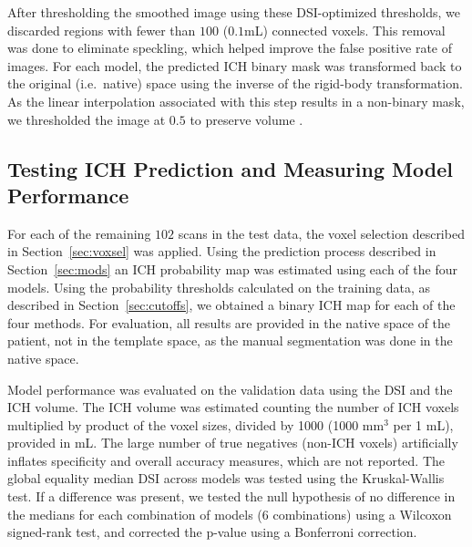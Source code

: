 \documentclass{elsarticle_nonatbib}\usepackage[]{graphicx}\usepackage[]{color}
\begin{document}
After thresholding the smoothed image using these DSI-optimized thresholds, we discarded regions with fewer than $100$ ($0.1$mL) connected voxels.  This removal was done to eliminate speckling, which helped improve the false positive rate of images.  For each model, the predicted ICH binary mask was transformed back to the original (i.e.~native) space using the inverse of the rigid-body transformation.  As the linear interpolation associated with this step results in a non-binary mask, we thresholded the image at $0.5$ to preserve volume \cite{flirt_reg}.



\subsection{Testing ICH Prediction and Measuring Model Performance}



For each of the remaining $102$ scans in the test data, the voxel selection described in Section~\ref{sec:voxsel} was applied. Using the prediction process described in Section~\ref{sec:mods} an ICH probability map was estimated using each of the four models.  Using the probability thresholds calculated on the training data, as described in Section~\ref{sec:cutoffs}, we obtained a binary ICH map for each of the four methods. For evaluation, all results are provided in
the native space of the patient, not in the template space, as the manual segmentation was done in the native space.

Model performance was evaluated on the validation data using the DSI and the ICH volume.  The ICH volume was estimated counting the number of ICH voxels multiplied by product of the voxel sizes, divided by 1000 (1000 mm$^3$ per 1 mL), provided in mL.  The large number of true negatives (non-ICH voxels) artificially inflates specificity and overall accuracy measures, which are not reported.  The global equality median DSI across models was tested using the Kruskal-Wallis test.  If a difference was present, we tested the null hypothesis of no difference in the medians for each combination of models ($6$ combinations) using a Wilcoxon signed-rank test, and corrected the p-value using a Bonferroni correction.  
\end{document}
